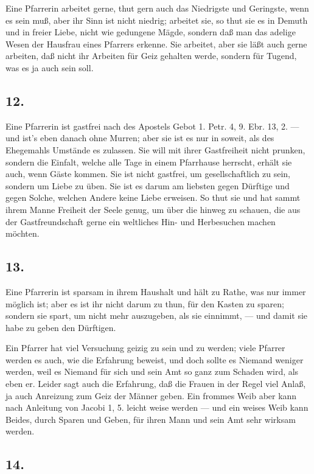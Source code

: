 Eine Pfarrerin arbeitet gerne, thut gern auch das Niedrigste und Geringste, wenn es sein muß, aber ihr Sinn ist nicht niedrig; arbeitet sie, so thut sie es in Demuth und in freier Liebe, nicht wie gedungene Mägde, sondern daß man das adelige Wesen der Hausfrau eines Pfarrers erkenne. Sie arbeitet, aber sie läßt auch gerne arbeiten, daß nicht ihr Arbeiten für Geiz gehalten werde, sondern für Tugend, was es ja auch sein soll.

\subsection{12.}

Eine Pfarrerin ist gastfrei nach des Apostels Gebot 1. Petr. 4, 9. Ebr. 13, 2. — und ist’s eben danach ohne Murren; aber sie ist es nur in soweit, als des Ehegemahls Umstände es zulassen. Sie will mit ihrer Gastfreiheit nicht prunken, sondern die Einfalt, welche alle Tage in einem Pfarrhause herrscht, erhält sie auch, wenn Gäste kommen. Sie ist nicht gastfrei, um gesellschaftlich zu sein, sondern um Liebe zu üben. Sie ist es darum am liebsten gegen Dürftige und gegen
Solche, welchen Andere keine Liebe erweisen. So thut sie und hat sammt ihrem Manne Freiheit der Seele genug, um über die hinweg zu schauen, die aus der Gastfreundschaft gerne ein weltliches Hin- und Herbesuchen machen möchten.

\subsection{13.}

Eine Pfarrerin ist sparsam in ihrem Haushalt und hält zu Rathe, was nur immer möglich ist; aber es ist ihr nicht darum zu thun, für den Kasten zu sparen; sondern sie spart, um nicht mehr auszugeben, als sie einnimmt, — und damit sie habe zu geben den Dürftigen.

Ein Pfarrer hat viel Versuchung geizig zu sein und zu werden; viele Pfarrer werden es auch, wie die Erfahrung beweist, und doch sollte es Niemand weniger werden, weil es Niemand für sich und sein Amt so ganz zum Schaden wird, als eben er. Leider sagt auch die Erfahrung, daß die Frauen in der Regel viel Anlaß, ja auch Anreizung zum Geiz der Männer geben. Ein frommes Weib aber kann nach Anleitung von Jacobi 1, 5. leicht weise werden — und ein weises Weib kann Beides, durch Sparen und Geben, für ihren Mann und sein Amt sehr wirksam werden.

\subsection{14.}

